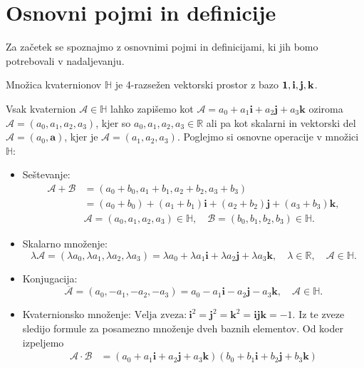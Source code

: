 \documentclass[mat1]{fmfdelo}
\newcommand{\R}{\mathbb R}
\newcommand{\HH}{\mathbb H}
\newcommand{\ii}{\boldsymbol i}
\newcommand{\jj}{\boldsymbol j}
\newcommand{\kk}{\boldsymbol k}
\newcommand{\A}{\mathcal A}
\newcommand{\B}{\mathcal B}
\begin{document}
\section{Osnovni pojmi in definicije}
Za začetek se spoznajmo z osnovnimi pojmi in definicijami, ki jih bomo potrebovali v nadaljevanju.
\begin{definicija}
Množica kvaternionov $\HH$ je 4-razsežen vektorski prostor z bazo $\bf{1},\bf{i},\bf{j},\bf{k}$.
\end{definicija}
Vsak kvaternion $\A \in \HH$ lahko zapišemo kot $\A = a_0 + a_1\mathbf{i} + a_2\mathbf{j} + a_3\mathbf{k}$ oziroma $\A=(a_0,a_1,a_2,a_3)$, kjer so $a_0,a_1,a_2,a_3\in \R$ ali pa kot skalarni in vektorski del $\A =(a_0,\boldsymbol{a})$, kjer je $\A = (a_1,a_2,a_3)$.
Poglejmo si osnovne operacije v množici $\HH$:\\
\begin{itemize}
\item Seštevanje:
\begin{equation*}
\begin{split}
\A + \B &= (a_0+b_0,a_1+b_1,a_2+b_2,a_3+b_3)  \\
 		  &=(a_0+b_0) + (a_1+b_1)\mathbf{i} + (a_2+b_2)\mathbf{j} + (a_3+b_3)\mathbf{k}, \\
 		  &  		  \A = (a_0,a_1,a_2,a_3) \in \HH, \quad \B = (b_0,b_1,b_2,b_3) \in \HH.
\end{split}
\end{equation*}
\item Skalarno množenje:
\begin{equation*}
\lambda \A = (\lambda a_0, \lambda a_1, \lambda a_2, \lambda a_3) =  \lambda a_0 + \lambda a_1 \mathbf{i} + \lambda a_2 \mathbf{j} + \lambda a_3 \mathbf{k}, \quad \lambda \in \R,\quad \A \in \HH.
\end{equation*}
\item Konjugacija:
\begin{equation*}
\overline{\A} = (a_0,-a_1,-a_2,-a_3)= a_0-a_1\mathbf{i} - a_2\mathbf{j} - a_3\mathbf{k}, \quad \A \in \HH .
\end{equation*}
\item Kvaternionsko množenje:
$\text{Velja zveza:}~\mathbf{i}^2 = \mathbf{j}^2 = \mathbf{k}^2 = \mathbf{ijk} = -1$. Iz te zveze sledijo formule za posamezno množenje dveh baznih elementov. Od koder izpeljemo
\begin{equation*}
\begin{split}
\A \cdot \B &= (a_0 + a_1\ii +a_2\jj+a_3\kk)(b_0+b_1\ii+b_2\jj+b_3\kk) \\

\end{split}
\end{equation*}
\end{itemize}
\end{document}
